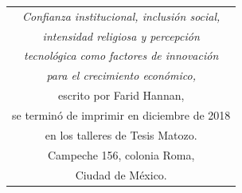 \documentclass[11pt, oneside]{book}
\begin{document}
\newpage
\thispagestyle{empty}
\begin{table}[p]
\centering
\small
\label{ed}
\begin{tabular}{c}
\textit{Confianza institucional, inclusión social,}\\ \textit{intensidad religiosa y percepción}\\ \textit{tecnológica como factores de innovación}\\ \textit{para el crecimiento económico,}\\ escrito por Farid Hannan,\\ se terminó de imprimir en diciembre de 2018\\ en los talleres de Tesis Matozo.\\ Campeche 156, colonia Roma,\\ Ciudad de México.
\end{tabular}
\end{table}


\end{document}

